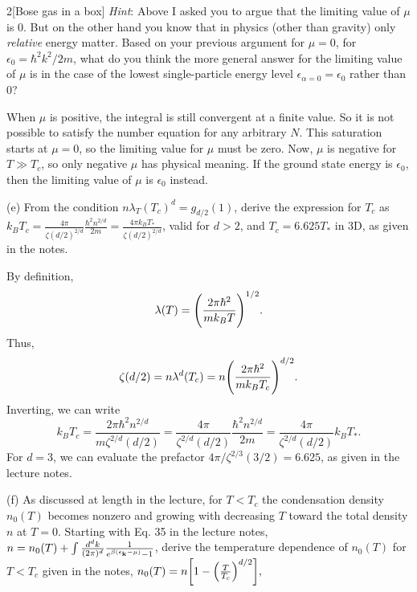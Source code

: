 \documentclass[12pt]{article}
\begin{document}
\begin{problem}{2}[Bose gas in a box]
\textit{Hint}: Above I asked you to argue that the limiting value of $\mu$ is 0.
But on the other hand you know that in physics (other than gravity)
only \textit{relative} energy matter. Based on your previous argument for
$\mu=0$, for $\epsilon_0=\hbar^2k^2/2m$, what do you think the more general
answer for the limiting value of $\mu$ is in the case of the lowest
single-particle energy level $\epsilon_{\alpha=0}=\epsilon_0$ rather than 0?
\begin{solution}
When $\mu$ is positive, the integral is still convergent at a finite value. So
it is not possible to satisfy the number equation for any arbitrary $N$. This
saturation starts at $\mu=0$, so the limiting value for $\mu$ must be zero. Now,
$\mu$ is negative for $T\gg T_c$, so only negative $\mu$ has physical meaning.
If the ground state energy is $\epsilon_0$, then the limiting value of $\mu$ is
$\epsilon_0$ instead.
\end{solution}

(e) From the condition $n\lambda_T(T_c)^d=g_{d/2}(1)$, derive the expression for
$T_c$ as
$k_BT_c=\frac{4\pi}{\zeta(d/2)^{2/d}}\frac{\hbar^2n^{2/d}}{2m}=\frac{4\pi
k_BT_\ast}{\zeta(d/2)^{2/d}}$, valid for $d>2$, and $T_c=6.625T_\ast$ in 3D, as
given in the notes.
\begin{solution}
By definition,
\begin{equation}
    \lambda(T)=\qty(\frac{2\pi\hbar^2}{mk_BT})^{1/2}. 
\end{equation}
Thus,
\begin{equation}
    \zeta(d/2)=n\lambda^d(T_c)=n\qty(\frac{2\pi\hbar^2}{mk_BT_c})^{d/2}. 
\end{equation}
Inverting, we can write
\begin{equation}
    k_BT_c=\frac{2\pi\hbar^2n^{2/d}}{m\zeta^{2/d}(d/2)}=\frac{4\pi}{\zeta^{2/d}(d/2)}\frac{\hbar^2n^{2/d}}{2m}
    =\frac{4\pi}{\zeta^{2/d}(d/2)}k_BT_\ast.
\end{equation}
For $d=3$, we can evaluate the prefactor $4\pi/\zeta^{2/3}(3/2)=6.625$, as given
in the lecture notes.
\end{solution}

(f) As discussed at length in the lecture, for $T<T_c$ the condensation density
$n_0(T)$ becomes nonzero and growing with decreasing $T$ toward the total
density $n$ at $T=0$. Starting with Eq. 35 in the lecture notes,
$n=n_0(T)+\int\frac{d^dk}{(2\pi)^d}\frac1{e^{\beta(\epsilon_{\vb{k}}-\mu)}-1}$,
derive the temperature dependence of $n_0(T)$ for $T<T_c$ given in the notes,
$n_0(T)=n\qty[1-\qty(\frac{T}{T_c})^{d/2}],$


\end{problem}
\end{document}
